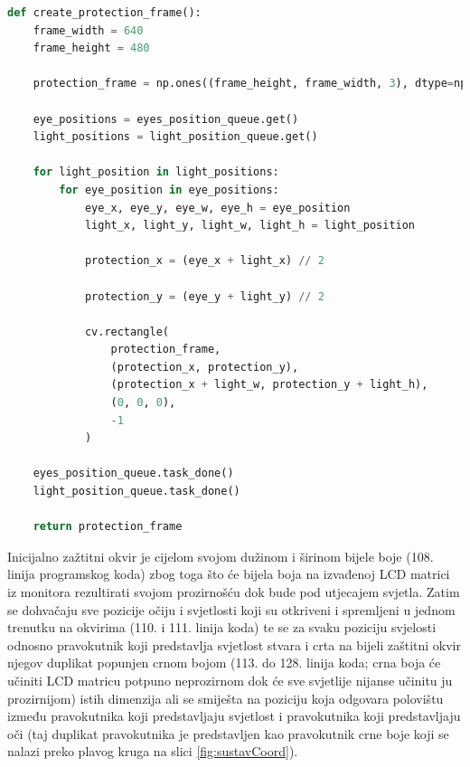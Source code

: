 \documentclass{foi}
\begin{document}
\begin{lstlisting}[language=Python, label={lst:lstlisting_10}, firstnumber=104, style=colored, caption={Definicija funkcije $create\_protection\_frame()$}]
def create_protection_frame():
    frame_width = 640
    frame_height = 480

    protection_frame = np.ones((frame_height, frame_width, 3), dtype=np.uint8) * 255

    eye_positions = eyes_position_queue.get()
    light_positions = light_position_queue.get()

    for light_position in light_positions:
        for eye_position in eye_positions:
            eye_x, eye_y, eye_w, eye_h = eye_position
            light_x, light_y, light_w, light_h = light_position

            protection_x = (eye_x + light_x) // 2

            protection_y = (eye_y + light_y) // 2

            cv.rectangle(
                protection_frame,
                (protection_x, protection_y),
                (protection_x + light_w, protection_y + light_h),
                (0, 0, 0),
                -1
            )

    eyes_position_queue.task_done()
    light_position_queue.task_done()

    return protection_frame
\end{lstlisting}

Inicijalno zažtitni okvir je cijelom svojom dužinom i širinom bijele boje (108. linija programskog koda) zbog toga što će bijela boja na izvađenoj LCD matrici iz monitora rezultirati svojom prozirnošću dok bude pod utjecajem svjetla. Zatim se dohvačaju sve pozicije očiju i svjetlosti koji su otkriveni i spremljeni u jednom trenutku na okvirima (110. i 111. linija koda) te se za svaku poziciju svjelosti odnosno pravokutnik koji predstavlja svjetlost stvara i crta na bijeli zaštitni okvir njegov duplikat popunjen crnom bojom (113. do 128. linija koda; crna boja će učiniti LCD matricu potpuno neprozirnom dok će sve svjetlije nijanse učinitu ju prozirnijom) istih dimenzija ali se smiješta na poziciju koja odgovara polovištu između pravokutnika koji predstavljaju svjetlost i pravokutnika koji predstavljaju oči (taj duplikat pravokutnika je predstavljen kao pravokutnik crne boje koji se nalazi preko plavog kruga na slici \ref{fig:sustavCoord}).
\end{document}
